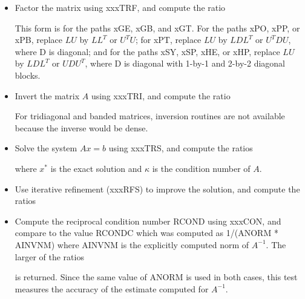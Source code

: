 \begin{itemize}
\item
Factor the matrix using xxxTRF, and compute the ratio
This form is for the paths xGE, xGB, and xGT.
For the paths xPO, xPP, or xPB, replace $LU$ by $LL^T$ or $U^TU$;
for xPT, replace $LU$ by $L D L^T$ or $U^T D U$, where D is diagonal;
and for the paths xSY, xSP, xHE, or xHP, replace $LU$ by $L D L^T$ or
$U D U^T$, where D is diagonal with 1-by-1 and 2-by-2 diagonal blocks.

\item
Invert the matrix $A$ using xxxTRI, and compute the ratio
For tridiagonal and banded matrices, inversion routines are not available because
the inverse would be dense.

\item
Solve the system $A x = b$ using xxxTRS, and compute the ratios
where $x^*$ is the exact solution and $\kappa$ is the condition
number of $A$. 

\item
Use iterative refinement (xxxRFS) to improve the solution,
and compute the ratios

\item
Compute the reciprocal condition number RCOND using xxxCON,
and compare to the value RCONDC which was computed as 1/(ANORM * AINVNM)
where AINVNM is the explicitly computed norm of $A^{-1}$.
The larger of the ratios
is returned.  Since the same value of ANORM is used in both cases,
this test measures the accuracy of the estimate computed for $A^{-1}$.

\end{itemize}
